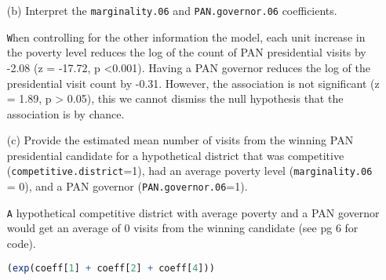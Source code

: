 \documentclass[12pt,letterpaper]{article}
\begin{document}
\begin{enumerate}
	\texttt When controlling for the other information the model, a district going from non-competitive to competitive reduces log count of districts visited by an average -0.08, suggesting competition is associated with a reduction in candidate visits. A p value <0.05 means that cannot reject the null hypothesis that this relationship is by chance (z = 0.477, p = 0.63)

	\item [(b)]
	Interpret the \texttt{marginality.06} and \texttt{PAN.governor.06} coefficients.
	
	\vspace{.25cm}
	
	\texttt When controlling for the other information the model, each unit increase in the poverty level reduces the log of the count of PAN presidential visits by -2.08 (z = -17.72, p <0.001). Having a PAN  governor reduces the log of the presidential visit count by  -0.31. However, the association is not significant (z = 1.89, p > 0.05), this we cannot dismiss the null hypothesis that the association is by chance. 
	\item [(c)]
	Provide the estimated mean number of visits from the winning PAN presidential candidate for a hypothetical district that was competitive (\texttt{competitive.district}=1), had an average poverty level (\texttt{marginality.06} = 0), and a PAN governor (\texttt{PAN.governor.06}=1).
	
	\vspace{.25cm}
	\texttt A hypothetical competitive district with average poverty and a PAN governor would get an average of 0 visits from the winning candidate (see pg 6 for code).
\begin{lstlisting}[language=R]
		(exp(coeff[1] + coeff[2] + coeff[4]))
\end{lstlisting}	
\end{enumerate}
\end{document}
